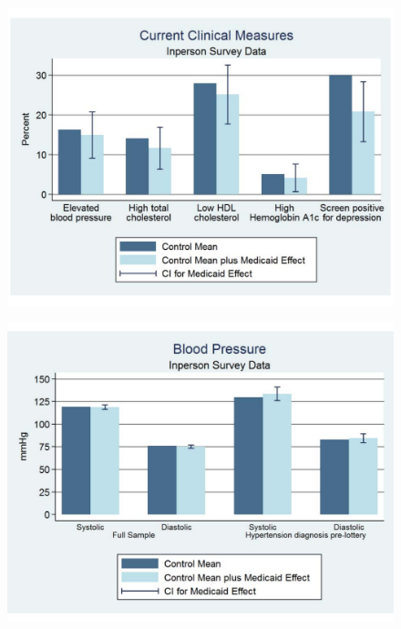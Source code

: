 \documentclass[notes=show]{beamer}
\begin{document}
\begin{frame}[plain]
	
	\begin{figure}
	\includegraphics[scale=0.40]{./lecture_includes/baicker_15.pdf}
	\end{figure}
\end{frame}

\begin{frame}[plain]
	
	\begin{figure}
	\includegraphics[scale=0.40]{./lecture_includes/baicker_16.pdf}
	\end{figure}
\end{frame}
\end{document}
